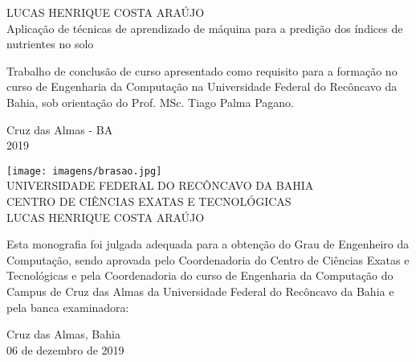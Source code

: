 \documentclass[
12pt,				%
oneside,			%
a4paper,			%
english,			%
french,				%
spanish,			%
brazil				%
]{abntex2}
\begin{document}
\normalsize


	\vfill
	\begin{center}
		
		{\large LUCAS HENRIQUE COSTA ARAÚJO\\}
		\vspace{2cm}
		{\Large Aplicação de técnicas de aprendizado de máquina para a predição dos índices de nutrientes no solo\\}
		\vspace{4cm}
		\hspace{.45\linewidth}
		\begin{minipage}{.50\linewidth}
			Trabalho de conclusão de curso apresentado como requisito para a formação no curso de Engenharia da Computação na Universidade Federal do Recôncavo da Bahia, sob orientação do Prof. MSc. Tiago Palma Pagano.
		\end{minipage}
		
		\vspace{2cm}
		\vfill
		{\large Cruz das Almas - BA\\ 2019}
	\end{center}
	

	\begin{folhadeaprovacao}
		
		\begin{center}
			\texttt{[image: imagens/brasao.jpg]}\\
			
			{\large UNIVERSIDADE FEDERAL DO RECÔNCAVO DA BAHIA} \\
			{\large CENTRO DE CIÊNCIAS EXATAS E TECNOLÓGICAS} \\
			
			\vspace{1.5cm}
			{LUCAS HENRIQUE COSTA ARAÚJO}\\
			\bfseries{}
		\end{center}
		
		Esta monografia foi julgada adequada para a obtenção do Grau de Engenheiro da Computação, sendo aprovada pelo Coordenadoria do Centro de Ciências Exatas e Tecnológicas e pela Coordenadoria do curso de Engenharia da Computação do Campus de Cruz das Almas da Universidade Federal do Recôncavo da Bahia e  pela banca examinadora:
		
		\vspace{0.15cm}
		\vspace{0.15cm}%
		
		\begin{center}
			Cruz das Almas, Bahia \\ 06 de dezembro de 2019
		\end{center}
	\end{folhadeaprovacao}
\end{document}
